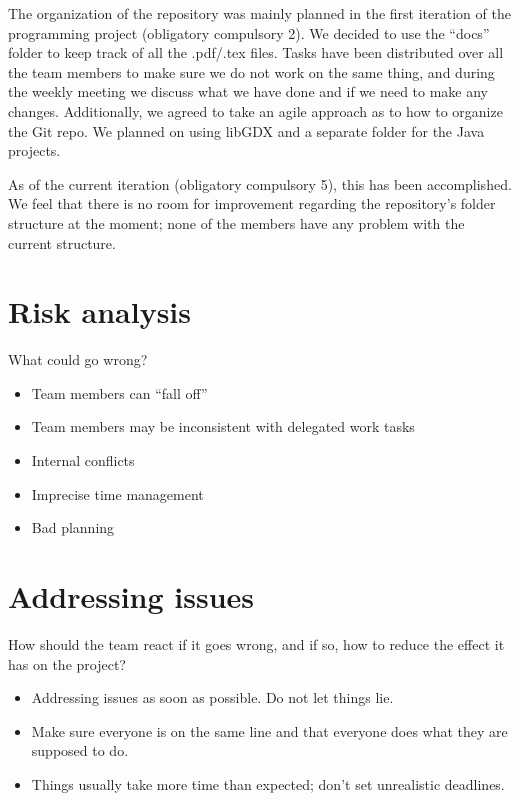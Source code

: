 \documentclass{article}
\begin{document}
The organization of the repository was mainly planned in the first iteration of the programming project (obligatory compulsory 2). We decided to use the “docs” folder to keep track of all the .pdf/.tex files. Tasks have been distributed over all the team members to make sure we do not work on the same thing, and during the weekly meeting we discuss what we have done and if we need to make any changes. Additionally, we agreed to take an agile approach as to how to organize the Git repo. We planned on using libGDX and a separate folder for the Java projects. 

As of the current iteration (obligatory compulsory 5), this has been accomplished. We feel that there is no room for improvement regarding the repository's folder structure at the moment; none of the members have any problem with the current structure.

\section*{Risk analysis}
What could go wrong?
\begin{itemize}
    \item Team members can “fall off”
    \item Team members may be inconsistent with delegated work tasks
    \item Internal conflicts
    \item Imprecise time management
    \item Bad planning
\end{itemize}

\section*{Addressing issues}
How should the team react if it goes wrong, and if so, how to reduce the effect it has on the project?
\begin{itemize}
    \item Addressing issues as soon as possible. Do not let things lie.
    \item Make sure everyone is on the same line and that everyone does what they are supposed to do.
    \item Things usually take more time than expected; don’t set unrealistic deadlines.
\end{itemize}
\end{document}
